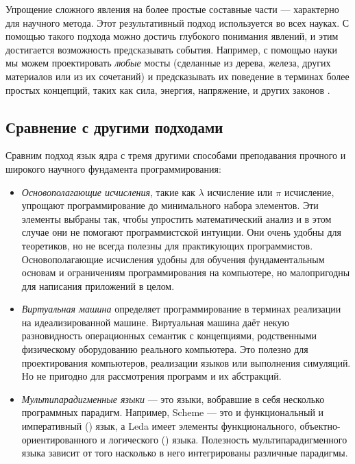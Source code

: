 Упрощение сложного явления на более простые составные части --- характерно для научного метода. Этот результативный подход используется во всех науках. С помощью такого подхода можно достичь глубокого понимания явлений, и этим достигается возможность предсказывать события. Например, с помощью науки мы можем проектировать \emph{любые} мосты (сделанные из дерева, железа, других материалов или из их сочетаний) и предсказывать их поведение в терминах более простых концепций, таких как сила, энергия, напряжение, и других законов \cite{62}.

\subsection*{Сравнение с другими подходами}

Сравним подход язык ядра с тремя другими способами преподавания прочного и широкого научного фундамента программирования:

\begin{itemize}
\item{\emph{Основополагающие исчисления}, такие как $\lambda$ исчисление или $\pi$ исчисление, упрощают программирование до минимального набора элементов. Эти элементы выбраны так, чтобы упростить математический анализ и в этом случае они не помогают программистской интуиции. Они очень удобны для теоретиков, но не всегда полезны для практикующих программистов. Основополагающие исчисления удобны для обучения фундаментальным основам и ограничениям программирования на компьютере, но малопригодны для написания приложений в целом.}

\item{\emph{Виртуальная машина} определяет программирование в терминах реализации на идеализированной машине. Виртуальная машина даёт некую разновидность операционных семантик с концепциями, родственными физическому оборудованию реального компьютера. Это полезно для проектирования компьютеров, реализации языков или выполнения симуляций. Но не пригодно для рассмотрения программ и их абстракций.}

\item{\emph{Мультипарадигменные языки} --- это языки, вобравшие в себя несколько программных парадигм. Например, Scheme --- это и функциональный и императивный (\cite{38}) язык, а Leda имеет элементы функционального, объектно-ориентированного и логического (\cite{27}) языка. Полезность мультипарадигменного языка зависит от того насколько в него интегрированы различные парадигмы.}
\end{itemize}

